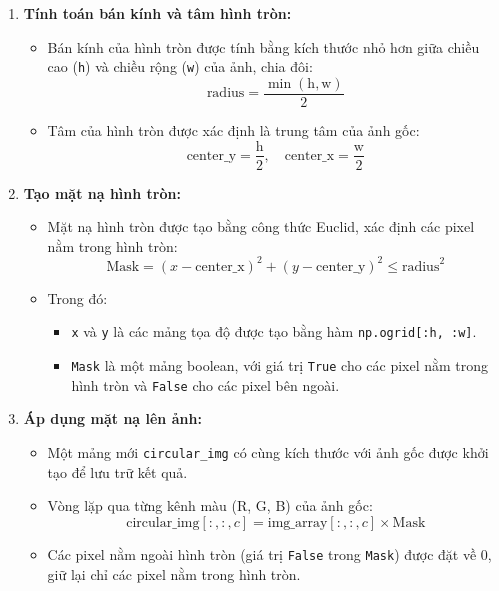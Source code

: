 \begin{enumerate}

	\item \textbf{Tính toán bán kính và tâm hình tròn:}
	      \begin{itemize}
		      \item Bán kính của hình tròn được tính bằng kích thước nhỏ hơn giữa chiều cao (\texttt{h}) và chiều rộng (\texttt{w}) của ảnh, chia đôi:
		            \[
			            \text{radius} = \frac{\min(\text{h}, \text{w})}{2}
		            \]
		      \item Tâm của hình tròn được xác định là trung tâm của ảnh gốc:
		            \[
			            \text{center\_y} = \frac{\text{h}}{2}, \quad \text{center\_x} = \frac{\text{w}}{2}
		            \]
	      \end{itemize}

	\item \textbf{Tạo mặt nạ hình tròn:}
	      \begin{itemize}
		      \item Mặt nạ hình tròn được tạo bằng công thức Euclid, xác định các pixel nằm trong hình tròn:
		            \[
			            \text{Mask} = (x - \text{center\_x})^2 + (y - \text{center\_y})^2 \leq \text{radius}^2
		            \]
		      \item Trong đó:
		            \begin{itemize}
			            \item \texttt{x} và \texttt{y} là các mảng tọa độ được tạo bằng hàm \texttt{np.ogrid[:h, :w]}.
			            \item \texttt{Mask} là một mảng boolean, với giá trị \texttt{True} cho các pixel nằm trong hình tròn và \texttt{False} cho các pixel bên ngoài.
		            \end{itemize}
	      \end{itemize}

	\item \textbf{Áp dụng mặt nạ lên ảnh:}
	      \begin{itemize}
		      \item Một mảng mới \texttt{circular\_img} có cùng kích thước với ảnh gốc được khởi tạo để lưu trữ kết quả.
		      \item Vòng lặp qua từng kênh màu (R, G, B) của ảnh gốc:
		            \[
			            \text{circular\_img}[:, :, c] = \text{img\_array}[:, :, c] \times \text{Mask}
		            \]
		      \item Các pixel nằm ngoài hình tròn (giá trị \texttt{False} trong \texttt{Mask}) được đặt về 0, giữ lại chỉ các pixel nằm trong hình tròn.
	      \end{itemize}

\end{enumerate}

